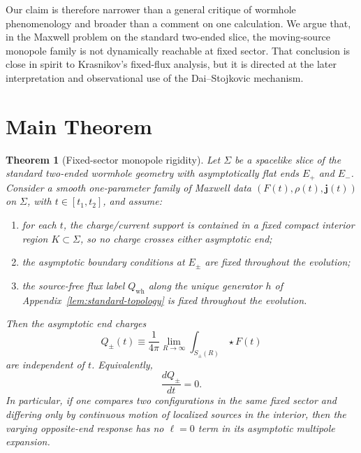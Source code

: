 \documentclass[aps,prd,onecolumn,nofootinbib,superscriptaddress]{revtex4-2}
\newtheorem{theorem}{Theorem}
\begin{document}
Our claim is therefore narrower than a general critique of wormhole phenomenology and broader than a comment on one calculation. We argue that, in the Maxwell problem on the standard two-ended slice, the moving-source monopole family is not dynamically reachable at fixed sector. That conclusion is close in spirit to Krasnikov's fixed-flux analysis, but it is directed at the later interpretation and observational use of the Dai--Stojkovic mechanism.

\section{Main Theorem}

\begin{theorem}[Fixed-sector monopole rigidity]
\label{thm:fixed-sector}
Let $\Sigma$ be a spacelike slice of the standard two-ended wormhole geometry with asymptotically flat ends $E_+$ and $E_-$. Consider a smooth one-parameter family of Maxwell data $(F(t),\rho(t),\bm{j}(t))$ on $\Sigma$, with $t\in [t_1,t_2]$, and assume:
\begin{enumerate}
    \item for each $t$, the charge/current support is contained in a fixed compact interior region $K\subset \Sigma$, so no charge crosses either asymptotic end;
    \item the asymptotic boundary conditions at $E_\pm$ are fixed throughout the evolution;
    \item the source-free flux label $Q_{\mathrm{wh}}$ along the unique generator $h$ of Appendix~\ref{lem:standard-topology} is fixed throughout the evolution.
\end{enumerate}
Then the asymptotic end charges
\begin{equation}
Q_{\pm}(t)\equiv \frac{1}{4\pi}\lim_{R\to\infty}\int_{S_{\pm}(R)} \star F(t)
\end{equation}
are independent of $t$. Equivalently,
\begin{equation}
\frac{dQ_\pm}{dt}=0.
\end{equation}
In particular, if one compares two configurations in the same fixed sector and differing only by continuous motion of localized sources in the interior, then the varying opposite-end response has no $\ell=0$ term in its asymptotic multipole expansion.
\end{theorem}
\end{document}
